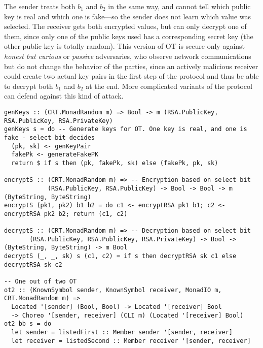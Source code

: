 \documentclass[sigplan,screen]{acmart}
\begin{document}
The sender treats both $b_1$ and $b_2$ in the same way, and cannot tell which public key is real and which one is fake---so the sender does not learn which value was selected. The receiver gets both encrypted values, but can only decrypt one of them, since only one of the public keys used has a corresponding secret key (the other public key is totally random). This version of OT is secure only against \emph{honest but curious} or \emph{passive} adversaries, who observe network communications but do not change the behavior of the parties, since an actively malicious receiver could create two actual key pairs in the first step of the protocol and thus be able to decrypt both $b_1$ and $b_2$ at the end. More complicated variants of the protocol can defend against this kind of attack.

\begin{figure*}
\begin{mdframed}
\begin{verbatim}
genKeys :: (CRT.MonadRandom m) => Bool -> m (RSA.PublicKey, RSA.PublicKey, RSA.PrivateKey)
genKeys s = do -- Generate keys for OT. One key is real, and one is fake - select bit decides
  (pk, sk) <- genKeyPair
  fakePk <- generateFakePK
  return $ if s then (pk, fakePk, sk) else (fakePk, pk, sk)

encryptS :: (CRT.MonadRandom m) => -- Encryption based on select bit
            (RSA.PublicKey, RSA.PublicKey) -> Bool -> Bool -> m (ByteString, ByteString)
encryptS (pk1, pk2) b1 b2 = do c1 <- encryptRSA pk1 b1; c2 <- encryptRSA pk2 b2; return (c1, c2)

decryptS :: (CRT.MonadRandom m) => -- Decryption based on select bit
       (RSA.PublicKey, RSA.PublicKey, RSA.PrivateKey) -> Bool -> (ByteString, ByteString) -> m Bool
decryptS (_, _, sk) s (c1, c2) = if s then decryptRSA sk c1 else decryptRSA sk c2

-- One out of two OT
ot2 :: (KnownSymbol sender, KnownSymbol receiver, MonadIO m, CRT.MonadRandom m) =>
  Located '[sender] (Bool, Bool) -> Located '[receiver] Bool
  -> Choreo '[sender, receiver] (CLI m) (Located '[receiver] Bool)
ot2 bb s = do
  let sender = listedFirst :: Member sender '[sender, receiver]
  let receiver = listedSecond :: Member receiver '[sender, receiver]


\end{verbatim}
\end{mdframed}
\end{figure*}
\end{document}
